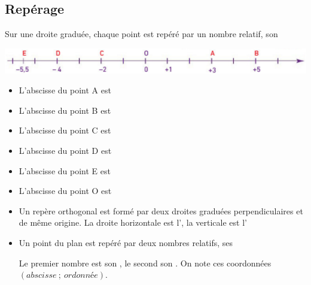 \subsection{Repérage}

\begin{mydef}
	Sur une droite graduée, chaque point est repéré par un nombre relatif, son %
\end{mydef}


\begin{myex}
	\begin{center}
		\includegraphics[scale=0.5]{img/droite2}		
	\end{center}

	\begin{multicols}{2}
		\begin{itemize}
		\item L'abscisse du point A est %
		\item L'abscisse du point B est %
		\item L'abscisse du point C est %
		\item L'abscisse du point D est %
		\item L'abscisse du point E est %
		\item L'abscisse du point O est %
	\end{itemize}
	\end{multicols}
\end{myex}


\begin{mydefs}
	\begin{itemize}
		\item Un repère orthogonal est formé par deux droites graduées perpendiculaires et de même origine. La droite horizontale est l'\hspace{6cm}, la verticale est l'%
		
		\item Un point du plan est repéré par deux nombres relatifs, ses %
		
		Le premier nombre est son \hspace{4cm}, le second son \hspace{4cm}. On note ces coordonnées $(abscisse \: ; \: ordonnée)$.
	\end{itemize}
\end{mydefs}


